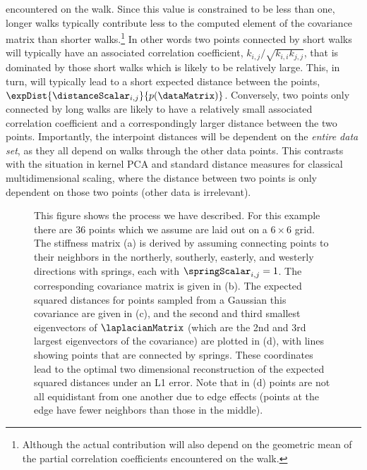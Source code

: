 encountered on the walk. Since this value is constrained to be less
than one, longer walks typically contribute less to the computed
element of the covariance matrix than shorter walks.\footnote{Although
  the actual contribution will also depend on the geometric mean of
  the partial correlation coefficients encountered on the walk.} In
other words two points connected by short walks will typically have an
associated correlation coefficient, $k_{i,j}/\sqrt{k_{i,i}k_{j,j}}$,
that is dominated by those short walks which is likely to be
relatively large. This, in turn, will typically lead to a short
expected distance between the points,
$\expDist{\distanceScalar_{i,j}}{p(\dataMatrix)}$. Conversely, two
points only connected by long walks are likely to have a relatively
small associated correlation coefficient and a correspondingly larger
distance between the two points. Importantly, the interpoint distances
will be dependent on the \emph{entire data set}, as they all depend on
walks through the other data points. This contrasts with the situation
in kernel PCA and standard distance measures for classical
multidimensional scaling, where the distance between two points is
only dependent on those two points (other data is irrelevant).
\begin{figure*}
  \hfill%
  \hfill
  \hfill%
  \caption{This figure shows the process we have described. For this
    example there are 36 points which we assume are laid out on a
    $6\times6$ grid. The stiffness matrix (a) is derived by assuming
    connecting points to their neighbors in the northerly, southerly,
    easterly, and westerly directions with springs, each with
    $\springScalar_{i,j}=1$. The corresponding covariance matrix is
    given in (b). The expected squared distances for points sampled
    from a Gaussian this covariance are given in (c), and the second
    and third smallest eigenvectors of $\laplacianMatrix$ (which are
    the 2nd and 3rd largest eigenvectors of the covariance) are
    plotted in (d), with lines showing points that are connected by
    springs. These coordinates lead to the optimal two dimensional
    reconstruction of the expected squared distances under an L1
    error. Note that in (d) points are not all equidistant from one
    another due to edge effects (points at the edge have fewer
    neighbors than those in the middle).}
\end{figure*}

